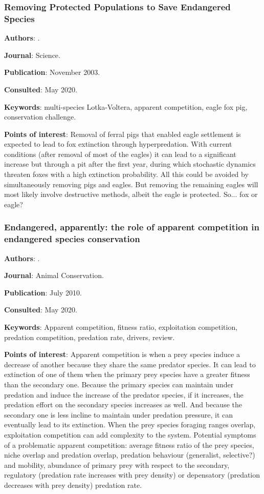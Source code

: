 \documentclass[12pt,a4paper]{article}
\begin{document}
\newpage

\subsubsection*{Removing Protected Populations to Save Endangered Species}

\textbf{Authors}: \cite{courchamp2003removing}.

\textbf{Journal}: Science.

\textbf{Publication}: November 2003.

\textbf{Consulted}: May 2020.

\textbf{Keywords}: multi-species Lotka-Voltera, apparent competition, eagle fox pig, conservation challenge.

\textbf{Points of interest}: Removal of ferral pigs that enabled eagle settlement is expected to lead to fox extinction through hyperpredation. With current conditions (after removal of most of the eagles) it can lead to a significant increase but through a pit after the first year, during which stochastic dynamics threaten foxes with a high extinction probability. All this could be avoided by simultaneously removing pigs and eagles. But removing the remaining eagles will most likely involve destructive methods, albeit the eagle is protected. So... fox or eagle?

\newpage 

\subsubsection*{Endangered, apparently: the role of apparent competition in endangered species conservation}

\textbf{Authors}: \cite{decesare2010endangered}.

\textbf{Journal}: Animal Conservation.

\textbf{Publication}: July 2010.

\textbf{Consulted}: May 2020.

\textbf{Keywords}: Apparent competition, fitness ratio, exploitation competition, predation competition, predation rate, drivers, review.

\textbf{Points of interest}: Apparent competition is when a prey species induce a decrease of another because they share the same predator species. It can lead to extinction of one of them when the primary prey species have a greater fitness than the secondary one. Because the primary species can maintain under predation and induce the increase of the predator species, if it increases, the predation effort on the secondary species increases as well. And because the secondary one is less incline to maintain under predation pressure, it can eventually lead to its extinction. When the prey species foraging ranges overlap, exploitation competition can add complexity to the system. Potential symptoms of a problematic apparent competition: average fitness ratio of the prey species, niche overlap and predation overlap, predation behaviour (generalist, selective?) and mobility, abundance of primary prey with respect to the secondary, regulatory (predation rate increases with prey density) or depensatory (predation decreases with prey density) predation rate.
\end{document}
